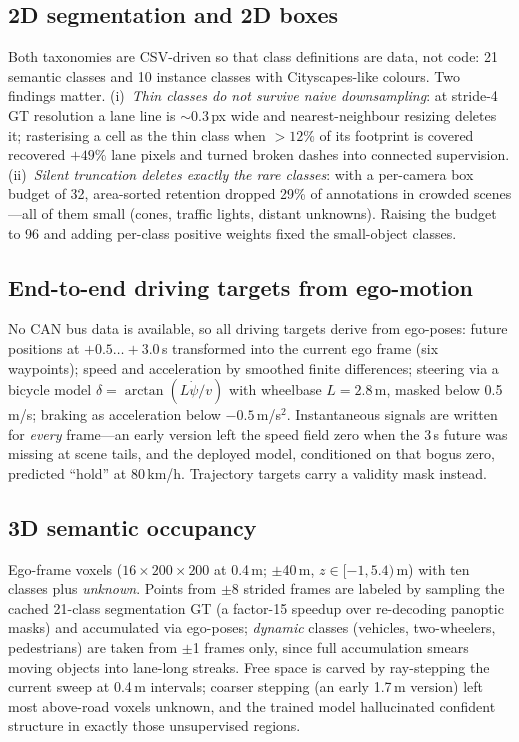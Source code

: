 \documentclass[10pt,twocolumn]{article}
\begin{document}
\subsection{2D segmentation and 2D boxes}
Both taxonomies are CSV-driven so that class definitions are data, not code:
21 semantic classes and 10 instance classes with Cityscapes-like colours. Two
findings matter. (i)~\emph{Thin classes do not survive naive downsampling}: at
stride-4 GT resolution a lane line is $\sim$0.3\,px wide and nearest-neighbour
resizing deletes it; rasterising a cell as the thin class when $>12\%$ of its
footprint is covered recovered $+49\%$ lane pixels and turned broken dashes
into connected supervision. (ii)~\emph{Silent truncation deletes exactly the
rare classes}: with a per-camera box budget of 32, area-sorted retention
dropped 29\% of annotations in crowded scenes---all of them small (cones,
traffic lights, distant unknowns). Raising the budget to 96 and adding
per-class positive weights fixed the small-object classes.

\subsection{End-to-end driving targets from ego-motion}
No CAN bus data is available, so all driving targets derive from ego-poses:
future positions at $+0.5\ldots+3.0$\,s transformed into the current ego frame
(six waypoints); speed and acceleration by smoothed finite differences;
steering via a bicycle model $\delta=\arctan(L\dot\psi/v)$ with wheelbase
$L{=}2.8$\,m, masked below 0.5\,m/s; braking as acceleration below
$-0.5$\,m/s$^2$. Instantaneous signals are written for \emph{every} frame---an
early version left the speed field zero when the 3\,s future was missing at
scene tails, and the deployed model, conditioned on that bogus zero, predicted
``hold'' at 80\,km/h. Trajectory targets carry a validity mask instead.

\subsection{3D semantic occupancy}
Ego-frame voxels ($16{\times}200{\times}200$ at 0.4\,m; $\pm$40\,m,
$z\in[-1,5.4)$\,m) with ten classes plus \emph{unknown}. Points from $\pm$8
strided frames are labeled by sampling the cached 21-class segmentation GT
(a factor-15 speedup over re-decoding panoptic masks) and accumulated via
ego-poses; \emph{dynamic} classes (vehicles, two-wheelers, pedestrians) are
taken from $\pm$1 frames only, since full accumulation smears moving objects
into lane-long streaks. Free space is carved by ray-stepping the current
sweep at 0.4\,m intervals; coarser stepping (an early 1.7\,m version) left
most above-road voxels unknown, and the trained model hallucinated confident
structure in exactly those unsupervised regions.
\end{document}
